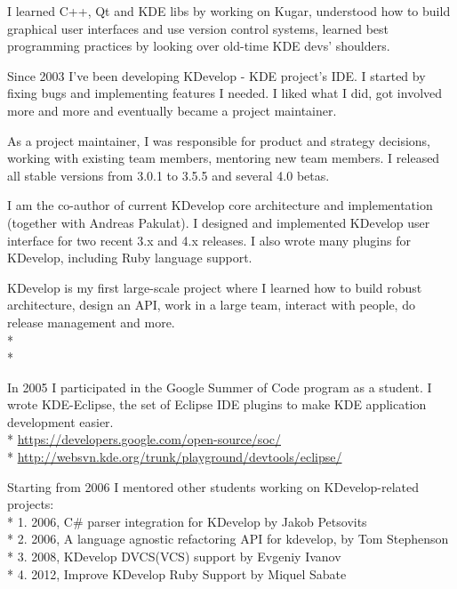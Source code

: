 \documentclass[12pt]{letter}
\begin{document}
\begin{llist}
            \item I learned C++, Qt and KDE libs by working on Kugar, understood how to build graphical user interfaces and use   version control systems, learned best programming practices by looking over old-time KDE devs' shoulders.

            \item Since 2003 I've been developing KDevelop - KDE project's IDE. I started by fixing bugs and implementing features I needed. I liked what I did, got involved more and more and eventually became a project maintainer.

            \item As a project maintainer, I was responsible for product and strategy decisions, working with existing team members, mentoring new team members. I released all stable versions from 3.0.1 to 3.5.5 and several 4.0 betas.

            \item I am the co-author of current KDevelop core architecture and implementation (together with Andreas Pakulat). I designed and implemented KDevelop user interface for two recent 3.x and 4.x releases. I also wrote many plugins for KDevelop, including Ruby language support.

            \item KDevelop is my first large-scale project where I learned how to build robust architecture, design an API, work in a large team, interact with people, do release management and more.\\*
            \\*

  \endexperience

  \location{}

  \startexperience

           \item In 2005 I participated in the Google Summer of Code program as a student. I wrote KDE-Eclipse, the set of Eclipse IDE plugins to make KDE application development easier.\\*
                \url{https://developers.google.com/open-source/soc/}\\*
                \url{http://websvn.kde.org/trunk/playground/devtools/eclipse/}

           \item Starting from 2006 I mentored other students working on KDevelop-related projects:\\*
                  1. 2006, C\# parser \/ integration for KDevelop by Jakob Petsovits\\*
                  2. 2006, A language agnostic refactoring API for kdevelop, by Tom Stephenson\\*
                  3. 2008, KDevelop DVCS(VCS) support by Evgeniy Ivanov\\*
                  4. 2012, Improve KDevelop Ruby Support by Miquel Sabate


\end{llist}
\end{document}
